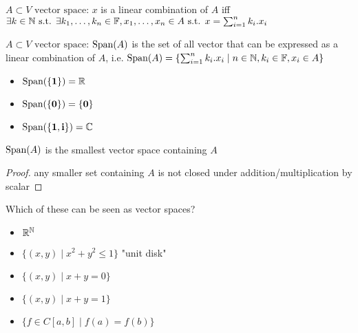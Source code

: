 \begin{definition}
	$A \subset V \text{ vector space}$: $x$ is a linear combination of $A$ iff $\exists k \in \mathbb{N} \text{ s.t. } \exists k_1,\dots,k_n \in \mathbb{F}, x_1,\dots,x_n \in A \text{ s.t. } x=\sum_{i=1}^{n}k_i.x_i$
\end{definition}
\begin{definition}[Span]
	$A \subset V \text{ vector space}$: $\text{Span}(A)$ is the set of all vector that can be expressed as a linear combination of $A$, i.e. $\text{Span}(A)=\{ \sum_{i=1}^{n}k_i.x_i \mid n\in \mathbb{N}, k_i \in \mathbb{F}, x_i\in A \}$
\end{definition}
\begin{example}
	\begin{itemize}
		\item $\text{Span}(\{\textbf{1}\})=\mathbb{R}$
		\item $\text{Span}(\{\textbf{0}\})=\{\textbf{0}\}$
		\item $\text{Span}(\{\textbf{1},\textbf{i}\})=\mathbb{C}$
	\end{itemize}
\end{example}
\begin{property}
	$\text{Span}(A)$ is the smallest vector space containing $A$
\end{property}
\begin{proof}
	any smaller set containing $A$ is not closed under addition/multiplication by scalar
\end{proof}
\begin{exercise}
	Which of these can be seen as vector spaces?
	\begin{itemize}
		\item $\mathbb{R}^{\mathbb{N}}$
		\item $\{ (x,y) \mid x^2+y^2 \leq 1 \}$ "unit disk"
		\item $\{ (x,y) \mid x+y=0 \}$
		\item $\{ (x,y) \mid x+y=1 \}$
		\item $\{ f \in C\left[ a,b \right] \mid f(a)=f(b) \}$
	\end{itemize}
\end{exercise}







